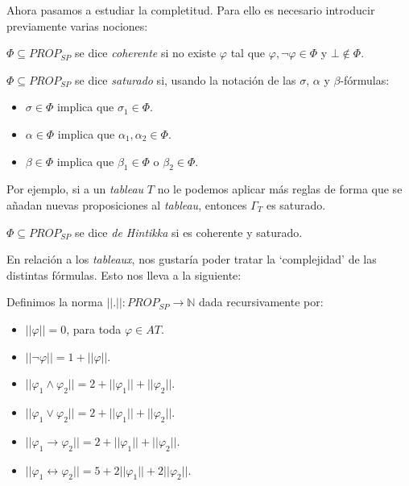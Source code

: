 Ahora pasamos a estudiar la completitud. Para ello es necesario introducir previamente varias nociones:

\begin{definition}
$\Phi \subseteq PROP_{SP}$ se dice \textit{coherente} si no existe $\varphi$ tal que $\varphi, \neg \varphi \in \Phi$ y $\bot \notin \Phi$.
\end{definition}

\begin{definition}
$\Phi \subseteq PROP_{SP}$ se dice \textit{saturado} si, usando la notación de las $\sigma$, $\alpha$ y $\beta$-fórmulas:
\begin{itemize}
    \item $\sigma \in \Phi$ implica que $\sigma_1 \in \Phi$.
    \item $\alpha \in \Phi$ implica que $\alpha_1, \alpha_2 \in \Phi$.
    \item $\beta \in \Phi$ implica que $\beta_1 \in \Phi$ o $\beta_2 \in \Phi$.
\end{itemize}
Por ejemplo, si a un \textit{tableau} $T$ no le podemos aplicar más reglas de forma que se añadan nuevas proposiciones al \textit{tableau}, entonces $\Gamma_T$ es saturado.
\end{definition}

\begin{definition}
$\Phi \subseteq PROP_{SP}$ se dice \textit{de Hintikka} si es coherente y saturado.
\end{definition}

En relación a los \textit{tableaux}, nos gustaría poder tratar la `complejidad' de las distintas fórmulas. Esto nos lleva a la siguiente:

\begin{definition}
Definimos la norma $||.||: PROP_{SP} \rightarrow \mathbb{N}$ dada recursivamente por:
\begin{itemize}
    \item $||\varphi|| = 0$, para toda $\varphi \in AT$.
    \item $||\neg \varphi|| = 1 + ||\varphi||$.
    \item $||\varphi_1 \land \varphi_2|| = 2 + ||\varphi_1|| + ||\varphi_2||$.
    \item $||\varphi_1 \lor \varphi_2|| = 2 + ||\varphi_1|| + ||\varphi_2||$.
    \item $||\varphi_1 \rightarrow \varphi_2|| = 2 + ||\varphi_1|| + ||\varphi_2||$.
    \item $||\varphi_1 \leftrightarrow \varphi_2|| = 5 + 2||\varphi_1|| + 2||\varphi_2||$.
\end{itemize}
\end{definition}

